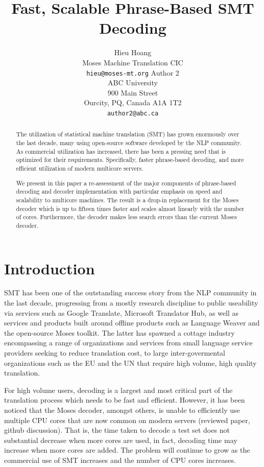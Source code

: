 \documentclass[11pt]{article}
\title{Fast, Scalable Phrase-Based SMT Decoding}
\author{Hieu Hoang\\
	    Moses Machine Translation CIC\\
	    {\tt hieu@moses-mt.org}
	  \And
	Author 2\\
  	ABC University\\
  	900 Main Street\\
  	Ourcity, PQ, Canada A1A 1T2\\
  {\tt author2@abc.ca}}
\date{}
\begin{document}
\maketitle

\begin{abstract}
The utilization of statistical machine translation (SMT) has grown enormously over the last decade, many using open-source software developed by the NLP community. As commercial utilization has increased, there has been a pressing need that is optimized for their requirements. Specifically, faster phrase-based decoding, and more efficient utilization of modern multicore servers.

We present in this paper a re-assessment of the major components of phrase-based decoding and decoder implementation with particular emphasis on speed and scalability to multicore machines. The result is a drop-in replacement for the Moses decoder which is up to fifteen times faster and scales almost linearly with the number of cores. Furthermore, the decoder makes less search errors than the current Moses decoder.

\end{abstract}

\section{Introduction}

SMT has been one of the outstanding success story from the NLP community in the last decade, progressing from a mostly research discipline to public useability via services such as Google Translate, Microsoft Translator Hub, as well as services and products built around offline products such as Language Weaver and the open-source Moses toolkit. The latter has spawned a cottage industry  encompassing a range of organizations and services from small language service providers seeking to reduce translation cost, to large inter-govermental organizations such as the EU and the UN that require high volume, high quality translation.

For high volume users, decoding is a largest and most critical part of the translation process which needs to be fast and efficient. However, it has been noticed that the Moses decoder, amongst others, is unable to efficiently use multiple CPU cores that are now common on modern servers (reviewed paper, github discussion). That is, the time taken to decode a test set does not substantial decrease when more cores are used, in fact, decoding time may increase when more cores are added. The problem will continue to grow as the commercial use of SMT increases and the number of CPU cores increases.
\end{document}
